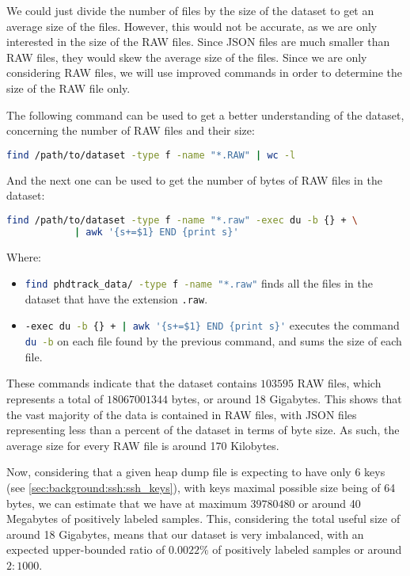     We could just divide the number of files by the size of the dataset to get an average size of the files. However, this would not be accurate, as we are only interested in the size of the RAW files. Since JSON files are much smaller than RAW files, they would skew the average size of the files. Since we are only considering RAW files, we will use improved commands in order to determine the size of the RAW file only.

    The following command can be used to get a better understanding of the dataset, concerning the number of RAW files and their size:

    \begin{lstlisting}[caption={Find the number of RAW files in the dataset}, language=bash]
        find /path/to/dataset -type f -name "*.RAW" | wc -l
    \end{lstlisting}

    And the next one can be used to get the number of bytes of RAW files in the dataset:

    \begin{lstlisting}[caption={Find the number of bytes of RAW files in the dataset}, language=bash]
        find /path/to/dataset -type f -name "*.raw" -exec du -b {} + \
            | awk '{s+=$1} END {print s}'
    \end{lstlisting}

    Where:
    \begin{itemize}
        \item \lstinline[language=bash]!find phdtrack_data/ -type f -name "*.raw"! finds all the files in the dataset that have the extension \lstinline[language=bash]!.raw!.
        \item \lstinline[language=bash]!-exec du -b {} + | awk '{s+=$1} END {print s}'! executes the command \lstinline[language=bash]!du -b! on each file found by the previous command, and sums the size of each file.
    \end{itemize}

    These commands indicate that the dataset contains $ 103595 $ RAW files, which represents a total of $ 18067001344 $ bytes, or around 18 Gigabytes. This shows that the vast majority of the data is contained in RAW files, with JSON files representing less than a percent of the dataset in terms of byte size. As such, the average size for every RAW file is around 170 Kilobytes. 

    Now, considering that a given heap dump file is expecting to have only 6 keys (see \ref{sec:background:ssh:ssh_keys}), with keys maximal possible size being of 64 bytes, we can estimate that we have at maximum $ 39780480 $ or around 40 Megabytes of positively labeled samples. This, considering the total useful size of around 18 Gigabytes, means that our dataset is very imbalanced, with an expected upper-bounded ratio of $ 0.0022\% $ of positively labeled samples or around $ 2:1000 $.

